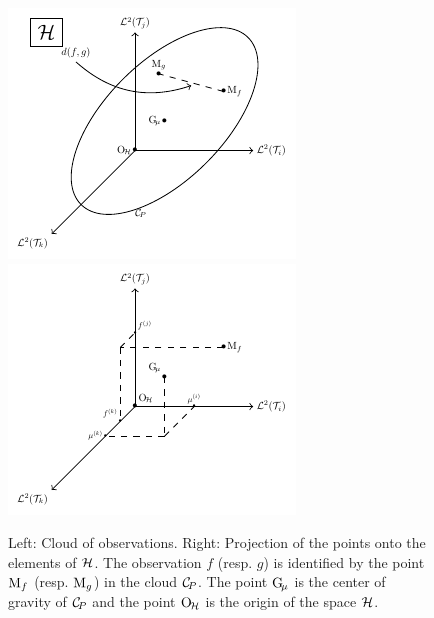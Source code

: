 \begin{figure}
    \centering
    \includegraphics[scale=1.2]{figures/cloud_obs}
    \includegraphics[scale=1.2]{figures/cloud_obs_proj}
    \caption{Left: Cloud of observations. Right: Projection of the points onto the elements of $\mathcal{H}$. The observation $f$ (resp. $g$) is identified by the point $\mathrm{M}_f$ (resp. $\mathrm{M}_g$) in the cloud $\mathcal{C}_{\!P}$. The point $\mathrm{G}_{\!\mu}$ is the center of gravity of $\mathcal{C}_{\!P}$ and the point $\mathrm{O}_{\!\mathcal{H}}$ is the origin of the space $\mathcal{H}$.}
    \label{fig:cloud_obs}
\end{figure}

